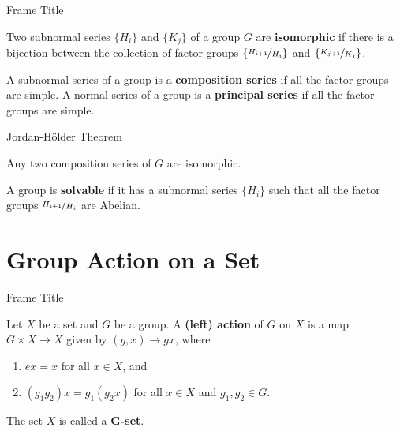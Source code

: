 \documentclass{beamer}
\begin{document}
\begin{frame}{Frame Title}
    \begin{definition}
        \justifying
        Two subnormal series $\{H_i\}$ and $\{K_j\}$ of a group $G$ are \textbf{isomorphic} if there is a bijection between the collection of factor groups $\left\{\nicefrac{H_{i+1}}{H_i}\right\}$ and $\left\{\nicefrac{K_{j+1}}{K_j}\right\}$.
    \end{definition}
    \pause
    \begin{definition}
        \justifying
        A subnormal series of a group is a \textbf{composition series} if all the factor groups are simple. A normal series of a group is a \textbf{principal series} if all the factor groups are simple.
    \end{definition}
\end{frame}

\begin{frame}{Jordan-H\"{o}lder Theorem}
    \begin{theorem}
        \justifying
        Any two composition series of $G$ are isomorphic.
    \end{theorem}
    \pause
    \begin{definition}
        \justifying
        A group is \textbf{solvable} if it has a subnormal series $\{H_i\}$ such that all the factor groups $\nicefrac{H_{i+1}}{H_i}$ are Abelian.
    \end{definition}
\end{frame}

\section{Group Action on a Set}

\begin{frame}{Frame Title}
    \begin{definition}
        \justifying
        Let $X$ be a set and $G$ be a group. A \textbf{(left) action} of $G$ on $X$ is a map $G \times X \to X$ given by $(g, x) \to gx$, where
        \begin{enumerate}
            \justifying
            \item $ex = x$ for all $x \in X$, and
            \item $(g_1g_2)x = g_1(g_2x)$ for all $x \in X$ and $g_1, g_2 \in G$.
        \end{enumerate}
        The set $X$ is called a \textbf{$\boldsymbol{G}$-set}. 
    \end{definition}
\end{frame}
\end{document}
